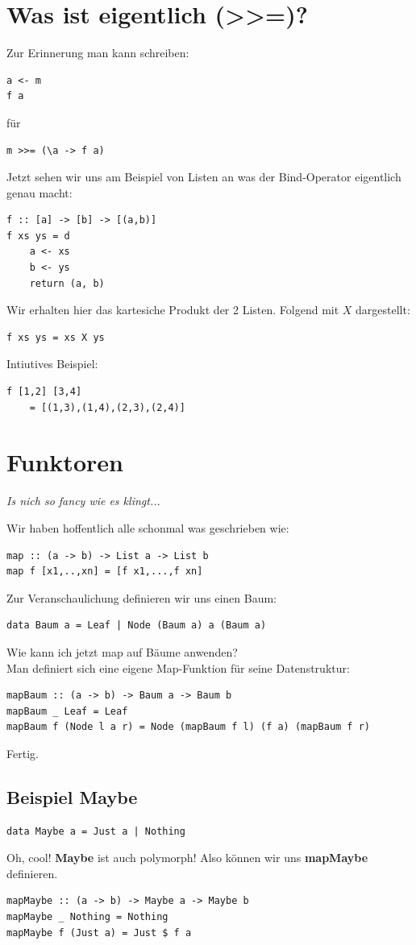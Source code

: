 \documentclass[ngerman,a4paper]{report}
\begin{document}
\section{Was ist eigentlich (>>=)?}
Zur Erinnerung man kann schreiben:
\begin{lstlisting}
a <- m
f a
\end{lstlisting}
für 
\begin{lstlisting}
m >>= (\a -> f a)
\end{lstlisting}
Jetzt sehen wir uns am Beispiel von Listen an was der Bind-Operator eigentlich genau macht:
\begin{lstlisting}
f :: [a] -> [b] -> [(a,b)]
f xs ys = d
	a <- xs
	b <- ys
	return (a, b)
\end{lstlisting}
Wir erhalten hier das kartesiche Produkt der 2 Listen. Folgend mit $X$ dargestellt:
\begin{lstlisting}
f xs ys = xs X ys
\end{lstlisting}
Intiutives Beispiel:
\begin{lstlisting}
f [1,2] [3,4]
	= [(1,3),(1,4),(2,3),(2,4)]
\end{lstlisting}

\section{Funktoren}
\emph{Is nich so fancy wie es klingt...}

Wir haben hoffentlich alle schonmal was geschrieben wie:
\begin{lstlisting}
map :: (a -> b) -> List a -> List b
map f [x1,..,xn] = [f x1,...,f xn]
\end{lstlisting}

Zur Veranschaulichung definieren wir uns einen Baum:
\begin{lstlisting}
data Baum a = Leaf | Node (Baum a) a (Baum a)
\end{lstlisting}

Wie kann ich jetzt map auf Bäume anwenden?\\
Man definiert sich eine eigene Map-Funktion für seine Datenstruktur:

\begin{lstlisting}
mapBaum :: (a -> b) -> Baum a -> Baum b
mapBaum _ Leaf = Leaf
mapBaum f (Node l a r) = Node (mapBaum f l) (f a) (mapBaum f r)
\end{lstlisting}
Fertig.
\subsection{Beispiel Maybe}
\begin{lstlisting}
data Maybe a = Just a | Nothing
\end{lstlisting}
Oh, cool! \textbf{Maybe} ist auch polymorph! Also können wir uns \textbf{mapMaybe} definieren.
\begin{lstlisting}
mapMaybe :: (a -> b) -> Maybe a -> Maybe b
mapMaybe _ Nothing = Nothing
mapMaybe f (Just a) = Just $ f a
\end{lstlisting}
\end{document}

